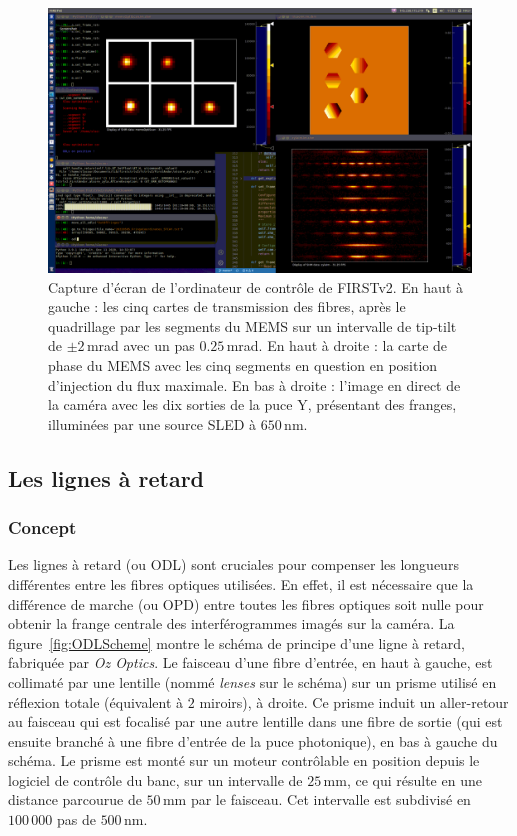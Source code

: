 \begin{figure}[ht!]
    \centering
    \includegraphics[width=\figwidth]{Figure_Chap2/20220505_5TC_AY_InjectionOpti_Fringes_Meudon.png}
    \caption[Capture d'écran de l'ordinateur de contrôle de FIRSTv2 montrant une optimisation de l'injection et les interférogrammes.]{Capture d'écran de l'ordinateur de contrôle de FIRSTv2. En haut à gauche : les cinq cartes de transmission des fibres, après le quadrillage par les segments du MEMS sur un intervalle de tip-tilt de $\pm 2 \,$mrad avec un pas $0.25 \,$mrad. En haut à droite : la carte de phase du MEMS avec les cinq segments en question en position d'injection du flux maximale. En bas à droite : l'image en direct de la caméra avec les dix sorties de la puce Y, présentant des franges, illuminées par une source SLED à $650 \,$nm.}
    \label{fig:OptiInj}
\end{figure}


\subsection{Les lignes à retard}
\label{sec:InstruODL}

\subsubsection{Concept}

Les lignes à retard (ou \acrfull{ODL}) sont cruciales pour compenser les longueurs différentes entre les fibres optiques utilisées. En effet, il est nécessaire que la différence de marche (ou \acrfull{OPD}) entre toutes les fibres optiques soit nulle pour obtenir la frange centrale des interférogrammes imagés sur la caméra. La figure~\ref{fig:ODLScheme} montre le schéma de principe d'une ligne à retard, fabriquée par \textit{Oz Optics}. Le faisceau d'une fibre d'entrée, en haut à gauche, est collimaté par une lentille (nommé \textit{lenses} sur le schéma) sur un prisme utilisé en réflexion totale (équivalent à $2$ miroirs), à droite. Ce prisme induit un aller-retour au faisceau qui est focalisé par une autre lentille dans une fibre de sortie (qui est ensuite branché à une fibre d'entrée de la puce photonique), en bas à gauche du schéma. Le prisme est monté sur un moteur contrôlable en position depuis le logiciel de contrôle du banc, sur un intervalle de $25 \,$mm, ce qui résulte en une distance parcourue de $50 \,$mm par le faisceau. Cet intervalle est subdivisé en $100\,000$ pas de $500 \,$nm.

